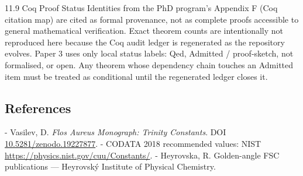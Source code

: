   11.9 Coq Proof Status
  Identities from the PhD program's Appendix F (Coq citation map) are cited as formal
  provenance, not as complete proofs accessible to general mathematical verification.
  Exact theorem counts are intentionally not reproduced here because the Coq audit
  ledger is regenerated as the repository evolves. Paper 3 uses only local status labels:
  Qed, Admitted / proof-sketch, not formalised, or open. Any theorem whose dependency
  chain touches an Admitted item must be treated as conditional until the regenerated
  ledger closes it.

\subsection{References}

- Vasilev, D. \textit{Flos Aureus Monograph: Trinity Constants}. DOI \href{https://zenodo.org/doi/10.5281/zenodo.19227877}{10.5281/zenodo.19227877}.
- CODATA 2018 recommended values: NIST \href{https://physics.nist.gov/cuu/Constants/}{https://physics.nist.gov/cuu/Constants/}.
- Heyrovska, R. Golden-angle FSC publications --- Heyrovský Institute of Physical Chemistry.
